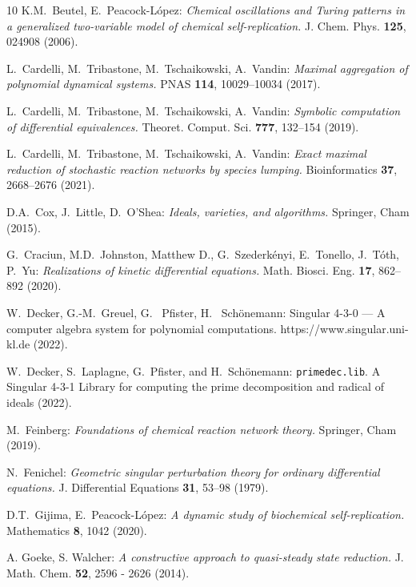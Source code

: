 \documentclass{article}
\begin{document}
\begin{thebibliography}{10}
 K.M.~Beutel, E.~Peacock-L\'opez: {\it Chemical oscillations 
and Turing patterns in a generalized two-variable model of chemical self-replication.}
J. Chem. Phys. {\bf 125}, 024908 (2006).

 L.~Cardelli, M.~Tribastone, M.~Tschaikowski, 
A.~Vandin: {\it Maximal aggregation of polynomial dynamical systems.} 
PNAS {\bf 114}, 10029--10034 (2017).

 L.~Cardelli, M.~Tribastone, M.~Tschaikowski, 
A.~Vandin: {\it Symbolic computation of differential equivalences.} 
Theoret. Comput. Sci. {\bf 777}, 132--154 (2019).

 L.~Cardelli, M.~Tribastone, M.~Tschaikowski, 
A.~Vandin: {\it Exact maximal reduction of stochastic reaction networks 
by species lumping.} Bioinformatics {\bf 37}, 2668--2676 (2021).

 D.A.\ Cox, J.\ Little, D.\ O'Shea: {\it  Ideals, varieties, 
and algorithms.} Springer, Cham (2015).

G.\ Craciun, M.D.\ Johnston, Matthew D., G.\ Szederkényi, 
E.\ Tonello, J.\ Tóth, P.\ Yu: {\it Realizations of kinetic differential equations.}
Math. Biosci. Eng. {\bf 17}, 862--892 (2020).

W.~Decker,   G.-M.~Greuel, G.~ Pfister, H.~ Sch{\"o}nemann: 
 {\sc Singular} {4-3-0} --- {A} computer algebra system for polynomial computations.
 {https://www.singular.uni-kl.de} (2022).

W.~Decker, S.~Laplagne,  G.~Pfister, and H.~Sch{\"o}nemann:
{\tt primedec.lib}. {A} {\sc Singular} {4-3-1} Library for computing the prime 
decomposition and radical of ideals  (2022).


 M.\ Feinberg: {\it Foundations of chemical reaction network 
theory.} Springer, Cham (2019).

 N.~Fenichel: {\it Geometric singular perturbation 
theory for ordinary differential equations.} J. Differential Equations 
{\bf 31}, 53--98 (1979).

 D.T.~Gijima, E.~Peacock-L\'opez: {\it A dynamic study of 
biochemical self-replication.} Mathematics {\bf 8}, 1042 (2020).

 A. Goeke, S. Walcher: {\it A constructive approach to quasi-steady 
state reduction.} J. Math. Chem. {\bf 52}, 2596 - 2626 (2014).


\end{thebibliography}
\end{document}
